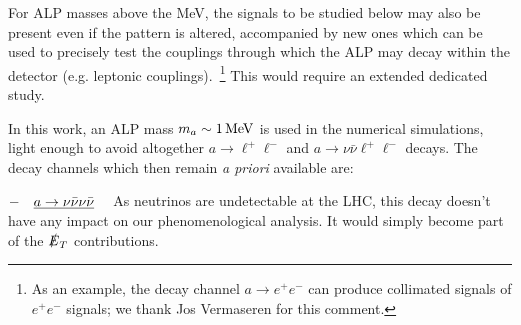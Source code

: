 \documentclass[11pt]{article}
\newcommand{\ETmiss}{\slashed{E}_T}
\renewcommand{\to}{\rightarrow}
\renewcommand{\[}{\begin{equation}}
\renewcommand{\]}{\end{equation}}
\begin{document}
For ALP masses above the MeV, the signals to be studied below may also be present even if the pattern is altered, accompanied by new ones which can be used to 
precisely test the couplings through which the ALP may decay within the detector (e.g. leptonic couplings).~\footnote{As an example, the decay 
channel $a\to e^+e^-$ can produce collimated signals of $e^+ e^-$ signals; we thank Jos Vermaseren for this comment.}  
  This would require an extended dedicated study.

 In this work,  an ALP mass $m_a\sim \unit[1]{MeV}$ is used in the numerical simulations,  light enough to avoid altogether 
$a \to \ell^{+}\ell^{-}$ and $a \to \nu\bar\nu \ell^{+}\ell^{-}$ decays. The decay channels which then remain {\it a priori} available are: 

\vspace{2mm}
  \noindent $- \quad {\uline{a\to \nu\bar{\nu}\nu\bar{\nu}}}\quad$ 
  As neutrinos are undetectable at the LHC, this decay doesn't have any impact on our phenomenological analysis. It would simply become part of the $\ETmiss$ contributions.
  
\end{document}
